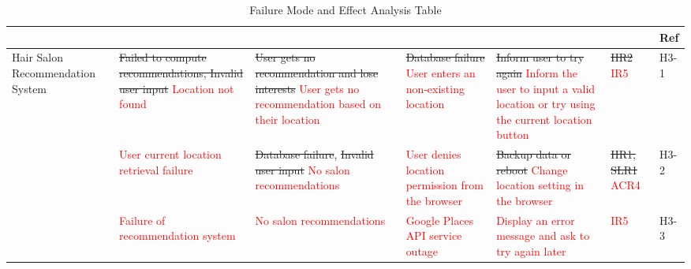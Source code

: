 \documentclass{article}
\begin{document}
\begin{landscape}
\begin{table}[h!]
\def\arraystretch{1.7}
\begin{tabularx}{1.2\textwidth} { |X|X|X|X|X
  | p{0.9cm}
  | p{0.9cm} | }
\hline
	\centering{Component} & \centering{Failure Mode} & \centering{Effects of Failure} & \centering{Causes of Failure} & \centering{Recommended Action} & \centering{SR} & Ref \\ \hline
         Hair Salon Recommendation System & \sout{Failed to compute recommendations, Invalid user input} \textcolor{red}{Location not found} & \sout{User gets no recommendation and lose interests} \textcolor{red}{User gets no recommendation based on their location}  & \sout{Database failure}  \textcolor{red}{User enters an non-existing location} & \sout{Inform user to try again}  \textcolor{red}{Inform the user to input a valid location or try using the current location button} & \sout{HR2} \textcolor{red}{IR5} & H3-1 \\ \cline{2-7}
     ~ & \textcolor{red}{User current location retrieval failure} & \sout{Database failure}, \sout{Invalid user input} \textcolor{red}{No salon recommendations} & \textcolor{red}{User denies location permission from the browser} & \sout{Backup data or reboot} \textcolor{red}{Change location setting in the browser} & \sout{HR1, SLR1} \textcolor{red}{ACR4} & H3-2 \\ \cline{2-7}
     ~ & \textcolor{red}{Failure of recommendation system} & \textcolor{red}{No salon recommendations} & \textcolor{red}{Google Places API service outage} & \textcolor{red}{Display an error message and ask to try again later} & \textcolor{red}{IR5} & H3-3 \\ \hline

\end{tabularx}
\caption{Failure Mode and Effect Analysis Table}
\label{FMEA Table}
\end{table}
\end{landscape}


\newpage
\end{document}
